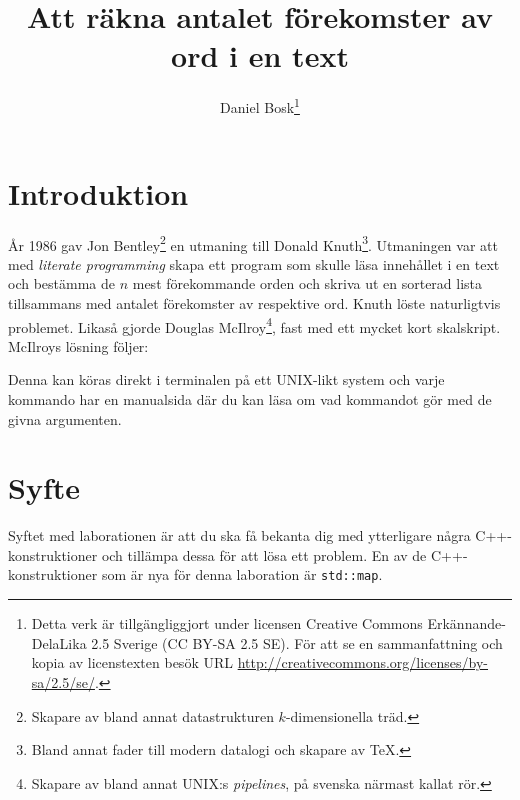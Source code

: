 \documentclass[a4paper]{miunasgn}
\title{Att räkna antalet förekomster av ord i en text}
\author{Daniel Bosk\footnote{%
	Detta verk är tillgängliggjort under licensen Creative Commons 
	Erkännande-DelaLika 2.5 Sverige (CC BY-SA 2.5 SE).
	För att se en sammanfattning och kopia av licenstexten besök URL 
	\url{http://creativecommons.org/licenses/by-sa/2.5/se/}.
}}
\date{\svnId}
\begin{document}
\maketitle
\thispagestyle{foot}
\tableofcontents


\section{Introduktion}
\noindent
År 1986 gav Jon Bentley\footnote{%
	Skapare av bland annat datastrukturen \(k\)-dimensionella träd.
} en utmaning till Donald Knuth\footnote{%
	Bland annat fader till modern datalogi och skapare av \TeX.
}.
Utmaningen var att med \emph{literate programming} skapa ett program som skulle 
läsa innehållet i en text och bestämma de \(n\) mest förekommande orden och 
skriva ut en sorterad lista tillsammans med antalet förekomster av respektive 
ord.
Knuth löste naturligtvis problemet.
Likaså gjorde Douglas McIlroy\footnote{%
	Skapare av bland annat UNIX:s \emph{pipelines}, på svenska närmast kallat 
	rör.
}, fast med ett mycket kort skalskript.
McIlroys lösning följer:
Denna kan köras direkt i terminalen på ett UNIX-likt system och varje kommando 
har en manualsida där du kan läsa om vad kommandot gör med de givna argumenten.


\section{Syfte}
\noindent
Syftet med laborationen är att du ska få bekanta dig med ytterligare några 
C++-konstruktioner och tillämpa dessa för att lösa ett problem.
En av de C++-konstruktioner som är nya för denna laboration är 
\texttt{std::map}.
\end{document}
